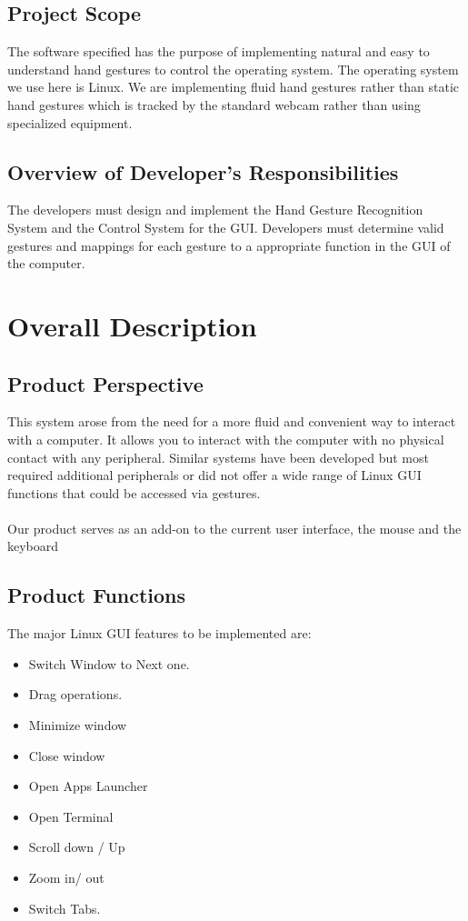 \documentclass{scrreprt}
\begin{document}
\section{Project Scope}
The software specified has the purpose of implementing natural and easy to understand hand gestures to control the operating system. The operating system we use here is Linux. We are implementing fluid hand gestures rather than static hand gestures which is tracked by the standard webcam rather than using specialized equipment.

\section{Overview of Developer's Responsibilities}
The developers must design and implement the Hand Gesture Recognition System and the Control System for the GUI. Developers must determine valid gestures and mappings for each gesture to a appropriate function in the GUI of the computer. 


\chapter{Overall Description}

\section{Product Perspective}

This system arose from the need for a more fluid and convenient way to interact with a computer. It allows you to interact with the computer with no physical contact with any peripheral. Similar systems have been developed but most required additional peripherals or did not offer a wide range of Linux GUI functions that could be accessed via gestures.
\\
\\Our product serves as an add-on to the current user interface, the mouse and the keyboard  

\section{Product Functions}
The major Linux GUI features to be implemented are:
\begin{itemize}
    \item Switch Window to Next one.
    \item Drag operations. 
    \item Minimize window
    \item Close window
    \item Open Apps Launcher
    \item Open Terminal
    \item Scroll down / Up
    \item Zoom in/ out
    \item Switch Tabs.
\end{itemize}
\end{document}
